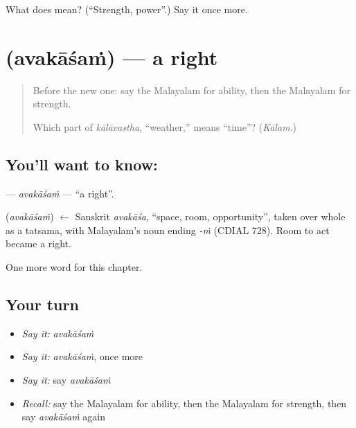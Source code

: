 \begin{tcolorbox}[breakable,colback=teal!4,colframe=teal!35!black,title={Before you move on}]
What does  mean? (\textquotedblleft{}Strength, power\textquotedblright{}.) Say it once more.
\end{tcolorbox}
\section[\texorpdfstring{\ml{അവകാശം} (avakāśaṁ)}{അവകാശം (avakāśaṁ)}]{ (avakāśaṁ) — a right}

\label{lesson:ML-C142-avakasam}



\begin{quote}
Before the new one: say the Malayalam for ability, then the Malayalam for strength.

Which part of \emph{kālāvastha}, \textquotedblleft{}weather,\textquotedblright{} means \textquotedblleft{}time\textquotedblright{}? (\emph{Kālam}.)
\end{quote}

\subsection*{You'll want to know: }
\textbf{} — \emph{avakāśaṁ} — \textquotedblleft{}a right\textquotedblright{}.

\begin{cousinweb}
\textbf{} (\emph{avakāśaṁ}) $\leftarrow$ Sanskrit \emph{avakāśa}, \textquotedblleft{}space, room, opportunity\textquotedblright{}, taken over whole as a tatsama, with Malayalam's noun ending \emph{-ṁ} (CDIAL 728). Room to act became a right.
\end{cousinweb}

\begin{grammarlens}[title={What you've built}]
One more word for this chapter.
\end{grammarlens}

\subsection*{Your turn}
\begin{itemize}
\raggedright
  \item \emph{Say it:} \emph{avakāśaṁ}
  \item \emph{Say it:} \emph{avakāśaṁ}, once more
  \item \emph{Say it:} say \emph{avakāśaṁ}
  \item \emph{Recall:} say the Malayalam for ability, then the Malayalam for strength, then say \emph{avakāśaṁ} again
\end{itemize}

